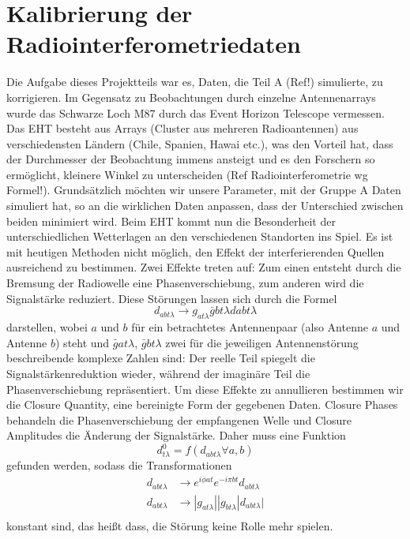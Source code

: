 \documentclass[]{dsadokumentation}
\begin{document}
\section{Kalibrierung der Radiointerferometriedaten}
Die Aufgabe dieses Projektteils war es, Daten, die Teil A (Ref!) simulierte, zu korrigieren. Im Gegensatz zu Beobachtungen durch einzelne Antennenarrays wurde das Schwarze Loch M87 durch das Event Horizon Telescope vermessen. Das EHT besteht aus Arrays (Cluster aus mehreren Radioantennen) aus verschiedensten Ländern (Chile, Spanien, Hawai etc.), was den Vorteil hat, dass der Durchmesser der Beobachtung immens ansteigt und es den Forschern so ermöglicht, kleinere Winkel zu unterscheiden (Ref Radiointerferometrie wg Formel!).
Grundsätzlich möchten wir unsere Parameter, mit der Gruppe A Daten simuliert hat, so an die wirklichen Daten anpassen, dass der Unterschied zwischen beiden minimiert wird. Beim EHT kommt nun die Besonderheit der unterschiedlichen Wetterlagen an den verschiedenen Standorten ins Spiel.
Es ist mit heutigen Methoden nicht möglich, den Effekt der interferierenden Quellen ausreichend zu bestimmen. Zwei Effekte treten auf: Zum einen entsteht durch die Bremsung der Radiowelle eine Phasenverschiebung, zum anderen wird die Signalstärke reduziert.
Diese Störungen lassen sich durch die Formel
$$d_{abt\lambda}\rightarrow g_{at\lambda} \bar{g}{bt\lambda}d{abt\lambda} $$
darstellen, wobei $a$ und $b$ für ein betrachtetes Antennenpaar (also Antenne $a$ und Antenne $b$) steht und $\bar{g}{at\lambda}$,  $\bar{g}{bt\lambda}$ zwei für die jeweiligen Antennenstörung beschreibende komplexe Zahlen sind: Der reelle Teil spiegelt die Signalstärkenreduktion wieder, während der imaginäre Teil die Phasenverschiebung repräsentiert.
Um diese Effekte zu annullieren bestimmen wir die Closure Quantity, eine bereinigte Form der gegebenen Daten. Closure Phases behandeln die Phasenverschiebung der empfangenen Welle und Closure Amplitudes die Änderung der Signalstärke. Daher muss eine Funktion $$d^0_{t\lambda}=f(d_{abt\lambda}\forall a,b)$$ gefunden werden, sodass die Transformationen
\begin{align*}
d_{abt\lambda} &\rightarrow e^{i \phi at} e^{-i\pi bt} d_{abt\lambda } \\
d_{abt\lambda}&\rightarrow|g_{at\lambda}||g_{bt\lambda}|d_{abt\lambda}|\\
\end{align*}
konstant sind, das heißt dass, die Störung keine Rolle mehr spielen.
\end{document}
